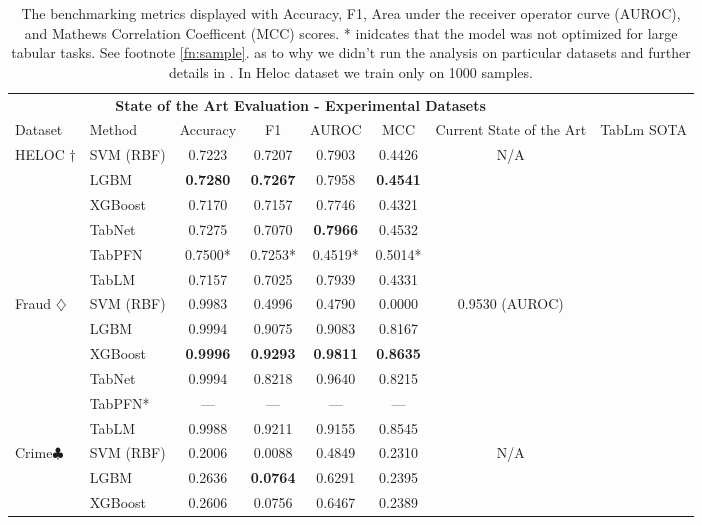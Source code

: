 \documentclass{article}
\newcommand{\cmark}{\ding{51}}%
\newcommand{\xmark}{\ding{55}}%
\theoremstyle{plain}
\theoremstyle{definition}
\theoremstyle{remark}
\begin{document}
\begin{table}[h!]
\caption{The benchmarking metrics displayed with Accuracy, F1, Area under the receiver operator curve (AUROC), and Mathews Correlation Coefficent (MCC) scores. * inidcates that the model was not optimized for large tabular tasks. See footnote \ref{fn:sample}. as to why we didn't run the analysis on particular datasets and further details in \cite{hollmann2022tabpfn}. In Heloc dataset we train only on 1000 samples.}
\vskip 0.15in
\begin{center}
\label{evaluation}
\begin{small}
\begin{sc}
\begin{adjustbox}{width=\textwidth}
\begin{tabular}{p{2cm}p{2.8cm}|cccc|c|c}
\toprule
\multicolumn{7}{c}{\textbf{State of the Art Evaluation - Experimental Datasets}} \\ 
Dataset & Method & Accuracy & F1 & AUROC & MCC &  Current State of the Art & TabLm SOTA \\
\hline
\multirow{6}{*}{HELOC $\dagger$} & SVM (RBF)&0.7223&0.7207&0.7903&0.4426&\multirow{6}{*}{N/A} &\multirow{6}{*}{\xmark}\\ 
& LGBM&\textbf{0.7280}&\textbf{0.7267}&0.7958&\textbf{0.4541}&\\ 
& XGBoost&0.7170&0.7157&0.7746&0.4321&\\ 
& TabNet&0.7275&0.7070&\textbf{0.7966}&0.4532&\\
& TabPFN&0.7500*&0.7253*&0.4519*&0.5014*&\\ 
& TabLM &0.7157&0.7025&0.7939&0.4331&\\ 
\hline
\multirow{6}{*}{Fraud $\diamondsuit$} & SVM (RBF)&0.9983&0.4996&0.4790&0.0000&\multirow{6}{*}{0.9530 (AUROC) \cite{xu2023deep}}&\multirow{6}{*}{\xmark}\\ 
& LGBM&0.9994&0.9075&0.9083&0.8167&\\ 
& XGBoost&\textbf{0.9996}&\textbf{0.9293}&\textbf{0.9811}&\textbf{0.8635}&\\ 
& TabNet&0.9994&0.8218&0.9640&0.8215&\\
& TabPFN*&---&---&---&---&\\ 
& TabLM &0.9988&0.9211&0.9155&0.8545&\\ 
\hline
\multirow{6}{*}{Crime$\clubsuit$} & SVM (RBF)&0.2006&0.0088&0.4849&0.2310&\multirow{6}{*}{N/A}&\multirow{6}{*}{\cmark}\\ 
& LGBM&0.2636&\textbf{0.0764}&0.6291&0.2395&\\ 
& XGBoost&0.2606&0.0756&0.6467&0.2389&\\ 

\end{tabular}
\end{adjustbox}
\end{sc}
\end{small}
\end{center}
\end{table}
\end{document}
